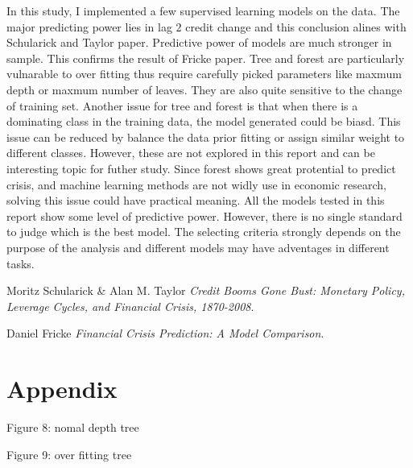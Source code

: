 \documentclass{article}
\newcommand{\ciapdf}[1]{\vspace*{-\parskip}\begin{center}\resizebox{0.75\textwidth}{!}{\texttt{[image: \#1]}}\end{center}}
\begin{document}
In this study, I implemented
a few supervised learning models on the data. The major predicting
power lies in lag 2 credit change and this conclusion alines with
Schularick and Taylor paper. Predictive power of models are much stronger in sample. This confirms the result of Fricke
paper. Tree and forest are particularly
vulnarable to over fitting thus require carefully picked parameters like
maxmum depth or maxmum number of leaves. They are also quite sensitive
to the change of training set. Another issue for
tree and forest is that when there is a dominating class in the training
data, the model generated could be biasd. This issue can be reduced by
balance the data prior fitting or assign similar weight to different
classes. However, these are not explored in this report and can be
interesting topic for futher study. Since forest shows great protential
to predict crisis, and machine learning methods are not widly use in
economic research, solving this issue could have practical meaning. All
the models tested in this report show some level of predictive power.
However, there is no single standard to judge which is the best model.
The selecting criteria strongly depends on the purpose of the analysis
and different models may have adventages in different tasks.

\begin{thebibliography}{9}
Moritz Schularick \& Alan M. Taylor
\textit{Credit Booms Gone Bust: Monetary Policy, Leverage Cycles, and Financial Crisis, 1870-2008}.

Daniel Fricke
\textit{Financial Crisis Prediction: A Model Comparison}.
\end{thebibliography}

\section*{Appendix}

Figure 8: nomal depth tree

\ciapdf{app_normaldepth.pdf}

Figure 9: over fitting tree 
\end{document}
